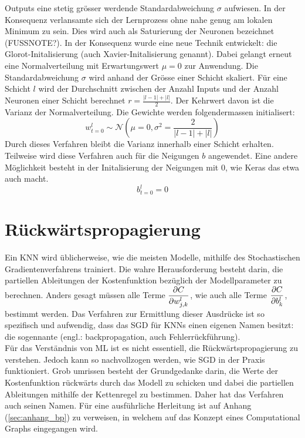 Outputs eine stetig grösser werdende Standardabweichung $\sigma$ aufwiesen.
In der Konsequenz verlansamte sich der Lernprozess ohne nahe genug am lokalen
Minimum zu sein. Dies wird auch als Saturierung der Neuronen bezeichnet (FUSSNOTE?).
\para{}
In der Konsequenz wurde eine neue Technik entwickelt: die Glorot-Initalisierung
(auch Xavier-Initalisierung genannt). Dabei gelangt erneut eine Normalverteilung
mit Erwartungswert $\mu = 0$ zur Anwendung. Die Standardabweichung $\sigma$ wird
anhand der Grösse einer Schicht skaliert.
Für eine Schicht $l$ wird der Durchschnitt zwischen der Anzahl Inputs
und der Anzahl Neuronen einer Schicht berechnet $r = \frac{|l-1| + |l|}{2}$. Der Kehrwert
davon ist die Varianz der Normalverteilung.
Die Gewichte werden folgendermassen initialisert:
\begin{equation}
  w_{t=0}^l \sim \mathcal{N}\left(\mu = 0, \sigma^2 = \frac{2}{|l-1| + |l|}\right)
\end{equation}
Durch dieses Verfahren bleibt die Varianz innerhalb einer Schicht erhalten.
Teilweise wird diese Verfahren auch für die Neigungen $b$ angewendet. Eine
andere Möglichkeit besteht in der Initalisierung der Neigungen mit 0, wie Keras
das etwa auch macht.
\begin{equation}
  b_{t=0}^l = 0
\end{equation}

\para{}
\cite{wiki:normal_distribution}
\cite{Nielsen}
\cite{book:hands-on}

\section{Rückwärtspropagierung}\label{sec:backpropagation}
Ein KNN wird üblicherweise, wie die meisten Modelle, mithilfe des Stochastischen
Gradientenverfahrens trainiert.
Die wahre Herausforderung besteht darin, die partiellen Ableitungen der
Kostenfunktion bezüglich der Modellparameter zu berechnen.
Anders gesagt müssen alle Terme
$\displaystyle\frac{\partial C}{\partial w_{j,k}^l}$, wie auch alle Terme $\displaystyle\frac{\partial C}{\partial b_k^l}$,
bestimmt werden.
Das Verfahren zur Ermittlung dieser Ausdrücke ist so spezifisch und aufwendig,
dass das SGD für KNNs einen eigenen Namen besitzt: die sogennante
 (engl.: backpropagation, auch
Fehlerrückführung). \\
Für das Verständnis von ML ist es nicht essentiell, die Rückwärtspropagierung zu
verstehen. Jedoch kann so nachvollzogen werden, wie SGD in der Praxis funktioniert.
\para{}
Grob umrissen besteht der Grundgedanke darin, die Werte der Kostenfunktion
rückwärts durch das Modell zu schicken und dabei die partiellen Ableitungen
mithilfe der Kettenregel zu bestimmen. Daher hat das Verfahren auch seinen Namen.
\para{}
Für eine ausführliche Herleitung ist auf Anhang
(\ref{sec:anhang_bp}) zu verweisen, in welchem auf das Konzept eines
Computational Graphs eingegangen wird.

